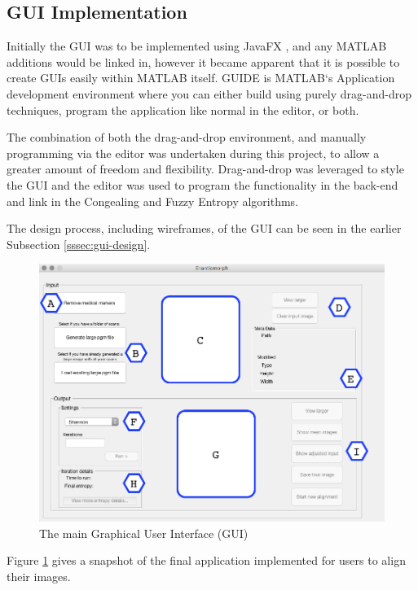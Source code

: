 \subsection{GUI Implementation}
\label{ssec:GUI-implement}

Initially the \acrfull{GUI} was to be implemented using JavaFX \cite{javafx}, and any MATLAB additions would be linked in, however it became apparent that it is possible to create \acrshort{GUI}s easily within MATLAB itself. GUIDE \cite{guide} is MATLAB`s Application development environment where you can either build using purely drag-and-drop techniques, program the application like normal in the editor, or both.

The combination of both the drag-and-drop environment, and manually programming via the editor was undertaken during this project, to allow a greater amount of freedom and flexibility. Drag-and-drop was leveraged to style the \acrshort{GUI} and the editor was used to program the functionality in the back-end and link in the \Gls{Congealing} and Fuzzy Entropy algorithms.

The design process, including wireframes, of the \acrshort{GUI} can be seen in the earlier Subsection \ref{sssec:gui-design}.

\begin{figure}[H]
  \center
  \includegraphics[scale=0.45]{Chapter2/software-img/final_gui.png}
  \caption{The main Graphical User Interface (GUI)}
  \label{fig:final_gui_pic}
\end{figure}

Figure \ref{fig:final_gui_pic} gives a snapshot of the final application implemented for users to align their images.

